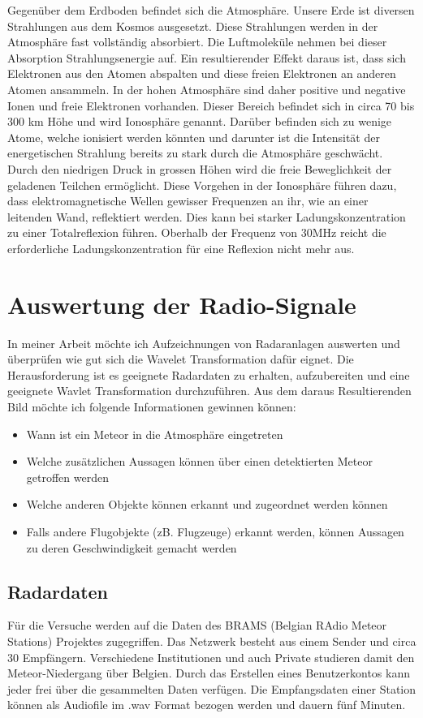 \begin{refsection}
Gegenüber dem Erdboden befindet sich die Atmosphäre.
Unsere Erde ist diversen Strahlungen aus dem Kosmos ausgesetzt.
Diese Strahlungen werden in der Atmosphäre fast vollständig absorbiert.
Die Luftmoleküle nehmen bei dieser Absorption Strahlungsenergie auf.
Ein resultierender Effekt daraus ist, dass sich Elektronen aus den Atomen abspalten und diese freien Elektronen an anderen Atomen ansammeln.
In der hohen Atmosphäre sind daher positive und negative Ionen und freie Elektronen vorhanden.
Dieser Bereich befindet sich in circa 70 bis 300 km Höhe und wird Ionosphäre genannt.
Darüber befinden sich zu wenige Atome, welche ionisiert werden könnten und darunter ist die Intensität der energetischen Strahlung bereits zu stark durch die Atmosphäre geschwächt.
Durch den niedrigen Druck in grossen Höhen wird die freie Beweglichkeit der geladenen Teilchen ermöglicht.
Diese Vorgehen in der Ionosphäre führen dazu, dass elektromagnetische Wellen gewisser Frequenzen an ihr, wie an einer leitenden Wand, reflektiert werden.
Dies kann bei starker Ladungskonzentration zu einer Totalreflexion führen. 
Oberhalb der Frequenz von 30MHz reicht die erforderliche Ladungskonzentration für eine Reflexion nicht mehr aus\cite{buch:meinke}.


\section{Auswertung der Radio-Signale}

In meiner Arbeit möchte ich Aufzeichnungen von Radaranlagen auswerten und überprüfen wie gut sich die Wavelet Transformation dafür eignet.
Die Herausforderung ist es geeignete Radardaten zu erhalten, aufzubereiten und eine geeignete Wavlet Transformation durchzuführen.
Aus dem daraus Resultierenden Bild möchte ich folgende Informationen gewinnen können:
\begin{itemize}
	\item Wann ist ein Meteor in die Atmosphäre eingetreten
	\item Welche zusätzlichen Aussagen können über einen detektierten Meteor getroffen werden 
	\item Welche anderen Objekte können erkannt und zugeordnet werden können
	\item Falls andere Flugobjekte (zB. Flugzeuge) erkannt werden, können Aussagen zu deren Geschwindigkeit gemacht werden
\end{itemize}

\subsection{Radardaten}
Für die Versuche werden auf die Daten des BRAMS (Belgian RAdio Meteor Stations) Projektes zugegriffen.
Das Netzwerk besteht aus einem Sender und circa 30 Empfängern.
Verschiedene Institutionen und auch Private studieren damit den Meteor-Niedergang über Belgien.
Durch das Erstellen eines Benutzerkontos kann jeder frei über die gesammelten Daten verfügen.
Die Empfangsdaten einer Station können als Audiofile im .wav Format bezogen werden und dauern fünf Minuten.


\end{refsection}

